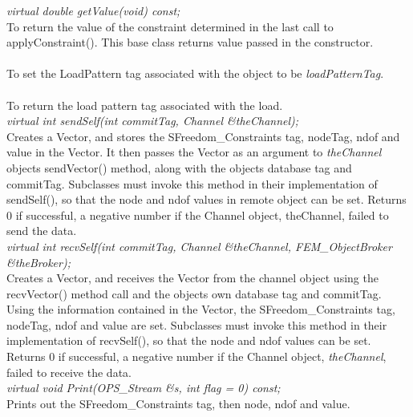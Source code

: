 {\em virtual double getValue(void) const;} \\
To return the value of the constraint determined in the last call to
applyConstraint(). This base class returns \p value passed in
the constructor.  \\ 

\\
To set the LoadPattern tag associated with the object to be {\em
loadPatternTag}. \\

\\ 
To return the load pattern tag associated with the load. \\

{\em virtual int sendSelf(int commitTag, Channel \&theChannel);} \\ 
Creates a Vector, and stores the SFreedom\_Constraints tag, nodeTag, ndof and value in
the Vector. It then passes the Vector as an argument to {\em
theChannel} objects sendVector() method, along with the objects 
database tag and \p commitTag. Subclasses must invoke this method
in their implementation of sendSelf(), so that the \p node
and \p ndof values in remote object can be set. Returns $0$ if
successful, a negative number if the Channel object, \p theChannel,
failed to send the data. \\ 

{\em virtual int recvSelf(int commitTag, Channel \&theChannel, FEM\_ObjectBroker
\&theBroker);} \\ 
Creates a Vector, and receives the Vector from the channel object
using the recvVector() method call and the objects own database
tag and \p commitTag. Using the information contained in the Vector, the 
SFreedom\_Constraints tag, nodeTag, ndof and value are set. Subclasses must
invoke this method in their implementation of recvSelf(), so
that the \p node and \p ndof values can be set. Returns $0$ if
successful, a negative number if the Channel object, {\em
theChannel}, failed to receive the data. \\   

{\em virtual void Print(OPS_Stream \&s, int flag = 0) const;} \\
Prints out the SFreedom\_Constraints tag, then \p node, \p ndof and
\p value. 


